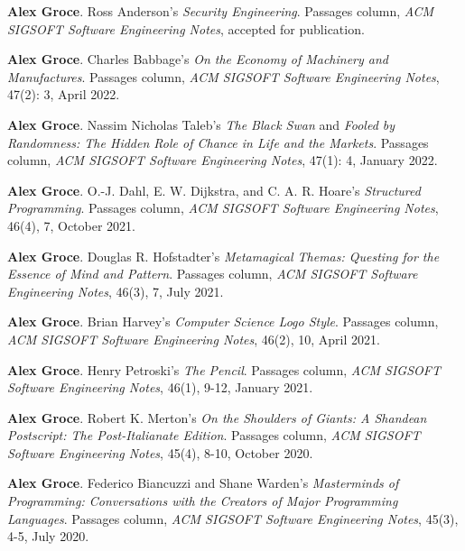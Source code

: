 \documentclass[ComputerScience]{vita}
\begin{document}
\begin{vita}
\begin{Columns, Book Reviews, and Magazine Articles}
\item {\bf Alex Groce}. 
\newblock Ross Anderson's \emph{Security Engineering}. 
\newblock Passages column, \emph{ACM SIGSOFT Software Engineering 
  Notes}, accepted for publication.
  
\item {\bf Alex Groce}. 
\newblock Charles Babbage's \emph{On the Economy of Machinery and Manufactures}. 
\newblock Passages column, \emph{ACM SIGSOFT Software Engineering 
  Notes}, 47(2): 3, April 2022.
  
\item {\bf Alex Groce}. 
\newblock Nassim Nicholas Taleb’s \emph{The Black Swan} and \emph{Fooled by Randomness: The Hidden Role of Chance in Life and the Markets}. 
\newblock Passages column, \emph{ACM SIGSOFT Software Engineering 
  Notes}, 47(1): 4, January 2022.

\item {\bf Alex Groce}. 
\newblock O.-J. Dahl, E. W. Dijkstra, and C. A. R. Hoare’s \emph{Structured Programming}.
\newblock Passages column, \emph{ACM SIGSOFT Software Engineering 
  Notes}, 46(4), 7, October 2021.

\item {\bf Alex Groce}. 
\newblock Douglas R. Hofstadter's \emph{Metamagical Themas: Questing for the Essence of Mind and Pattern}. 
\newblock Passages column, \emph{ACM SIGSOFT Software Engineering 
  Notes}, 46(3), 7, July 2021.
  
\item {\bf Alex Groce}. 
\newblock Brian Harvey's \emph{Computer Science Logo Style}. 
\newblock Passages column, \emph{ACM SIGSOFT Software Engineering 
  Notes}, 46(2), 10, April 2021.

\item {\bf Alex Groce}. 
\newblock Henry Petroski's \emph{The Pencil}. 
\newblock Passages column, \emph{ACM SIGSOFT Software Engineering 
  Notes}, 46(1), 9-12, January 2021.
  
\item {\bf Alex Groce}. 
\newblock Robert K. Merton's \emph{On the Shoulders of Giants: A
  Shandean Postscript: The Post-Italianate Edition}. 
\newblock Passages column, \emph{ACM SIGSOFT Software Engineering 
  Notes}, 45(4), 8-10, October 2020.

\item {\bf Alex Groce}. 
\newblock Federico Biancuzzi and Shane Warden's \emph{Masterminds of 
  Programming: Conversations with the Creators of Major Programming Languages}. 
\newblock Passages column, \emph{ACM SIGSOFT Software Engineering 
  Notes}, 45(3), 4-5, July 2020.
  

\end{Columns, Book Reviews, and Magazine Articles}
\end{vita}
\end{document}
